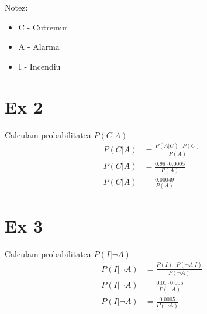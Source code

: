 \documentclass{article}
\begin{document}
Notez:
\begin{itemize}
  \item C - Cutremur
  \item A - Alarma
  \item I - Incendiu
\end{itemize}

\section*{Ex 2}

Calculam probabilitatea $P(C | A)$\\
\begin{align*}
  P(C | A) &= \frac{P(A|C) \cdot P(C)}{P(A)}\\
  P(C | A) &= \frac{0.98 \cdot 0.0005}{P(A)}\\
  P(C | A) &= \frac{0.00049}{P(A)}
\end{align*}

\section*{Ex 3}

Calculam probabilitatea $P(I | \neg A)$\\
\begin{align*}
  P(I | \neg A) &= \frac{P(I) \cdot P(\neg A | I)}{P(\neg A)}\\
  P(I | \neg A) &= \frac{0.01 \cdot 0.005}{P(\neg A)}\\
  P(I | \neg A) &= \frac{0.0005}{P(\neg A)}
\end{align*}
\end{document}
